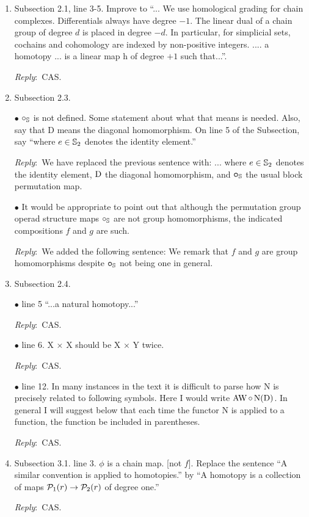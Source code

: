\documentclass{amsart}
\newcommand{\ar}{\medskip\noindent\textit{Reply}:\ }
\def\subitem{\medskip\noindent$\bullet$ }
\begin{document}
\begin{enumerate}
	\item Subsection 2.1, line 3-5. Improve to “... We use homological grading for chain complexes.
	Differentials always have degree $-1$.
	The linear dual of a chain group of degree $d$ is placed in degree $-d$.
	In particular, for simplicial sets, cochains and cohomology are	indexed by non-positive integers.
	.... a homotopy ... is a linear map h of degree $+1$ such that...”.

	\ar CAS.

	\item Subsection 2.3.

	\subitem $\mathbin{\circ}_{\mathbb{S}}$ is not defined.
	Some statement about what that means is needed.
	Also, say that D means the diagonal homomorphism.
	On line 5 of the Subsection, say “where $e \in \mathbb{S}_2$ denotes the identity element.”

	\ar We have replaced the previous sentence with: ... where $e \in \mathbb{S}_2$ denotes the identity element, $\mathrm{D}$ the diagonal homomorphism, and $\bm{\mathbin{\circ}}_{\mathbb{S}}$ the usual block permutation map.

	\subitem It would be appropriate to point out that although the permutation group operad structure maps $\mathbin{\circ}_{\mathbb{S}}$ are not group homomorphisms, the indicated compositions $f$ and $g$ are such.

	\ar We added the following sentence: We remark that $f$ and $g$ are group homomorphisms despite $\bm{\mathbin{\circ}}_{\mathbb{S}}$ not being one in general.

	\item Subsection 2.4.

	\subitem line 5 “...a natural homotopy...”

	\ar CAS.

	\subitem line 6. X × X should be X × Y twice.

	\ar CAS.

	\subitem line 12. In many instances in the text it is difficult to parse how N is precisely related to following symbols.
	Here I would write $\operatorname{AW} \mathbin{\circ} \operatorname{N}(\mathrm{D})$.
	In general I will suggest below that each time the functor N is applied to a function, the function be included in parentheses.

	\ar CAS.

	\item Subsection 3.1. line 3. $\phi$ is a chain map. [not $f$].
	Replace the sentence “A similar convention is applied to homotopies.” by “A homotopy is
	a collection of maps $\mathcal{P}_1(r) \to \mathcal{P}_2(r)$ of degree one.”

	\ar CAS.


\end{enumerate}
\end{document}
